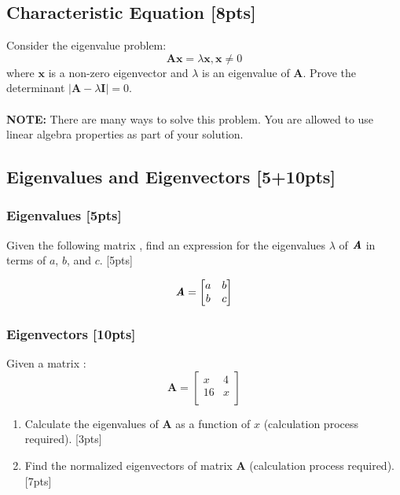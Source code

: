 \documentclass{article}
\begin{document}
\newpage



\subsection{Characteristic Equation [8pts]}
Consider the eigenvalue problem: 
$$\boldsymbol{Ax} =\lambda \boldsymbol{x}, \boldsymbol{x} \neq 0$$
where $\boldsymbol{x}$ is a non-zero eigenvector and $\lambda$ is an eigenvalue of $\boldsymbol{A}$. Prove the determinant $|\boldsymbol{A}-\lambda \boldsymbol{I}|= 0$.\\ \\
\textbf{NOTE:} There are many ways to solve this problem. You are allowed to use linear algebra properties as part of your solution. \\
\newline

\newpage



\subsection{Eigenvalues and Eigenvectors [5+10pts]}
\subsubsection{Eigenvalues [5pts]}
Given the following matrix , find an expression for the eigenvalues $\lambda$ of $\textbf{\textit{A}}$ in terms of $a$, $b$, and $c$. [5pts] 

$$\textbf{\textit{A}}=\begin{bmatrix}
    a & b \\
    b & c
\end{bmatrix}$$



\subsubsection{Eigenvectors [10pts]}
Given a matrix :
$$\boldsymbol{A} = \begin{bmatrix} 
    x & 4  \\ 
    16 & x \\
\end{bmatrix}$$
\begin{enumerate}[label=(\alph*)]
    \item Calculate the eigenvalues of $\boldsymbol{A}$ as a function of $x$ (calculation process required). [3pts]
    \item Find the normalized eigenvectors of matrix $\boldsymbol{A}$ (calculation process required). [7pts]
\end{enumerate}
\end{document}
